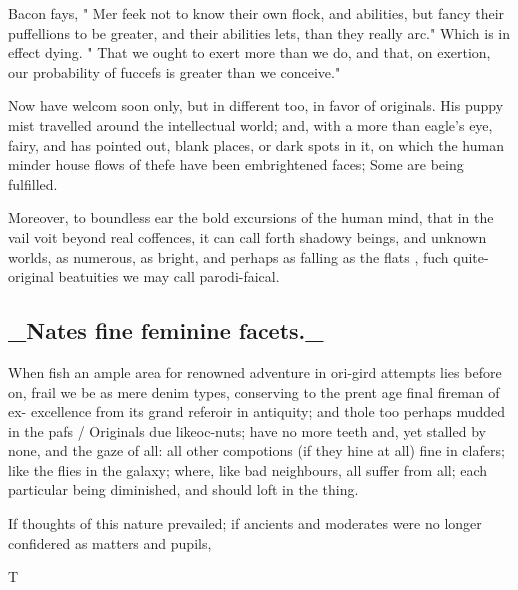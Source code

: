 Bacon fays, " Mer feek not to know their own flock, and abilities, but fancy their puffellions to be greater, and their abilities lets, than they really arc." Which is in effect dying. " That we ought to exert more than we do, and that, on exertion, our probability of fuccefs is greater than we conceive."\par\medskip
Now have welcom soon only, but in different too, in favor of originals. His puppy mist travelled around the intellectual world; and, with a more than eagle’s eye, fairy, and has pointed out, blank places, or dark spots in it, on which the human minder house flows of thefe have been embrightened faces; Some are being fulfilled.\par\medskip
Moreover, to boundless ear the bold excursions of the human mind, that in the vail voit beyond real coffences, it can call forth shadowy beings, and unknown worlds, as numerous, as bright, and perhaps as falling as the flats , fuch quite-original beatuities we may call parodi-faical.\par\medskip
\subsection*{\_Nates fine feminine facets.\_}
When fish an ample area for renowned adventure in ori-gird attempts lies before on, frail we be as mere denim types, conserving to the prent age final fireman of ex- excellence from its grand referoir in antiquity; and thole too perhaps mudded in the pafs / Originals due likeoc-nuts; have no more teeth and, yet stalled by none, and the gaze of all: all other compotions (if they hine at all) fine in clafers; like the flies in the galaxy; where, like bad neighbours, all suffer from all; each particular being diminished, and should loft in the thing.\par\medskip
If thoughts of this nature prevailed; if ancients and moderates were no longer confidered as matters and pupils,\par\medskip
T\par\medskip
